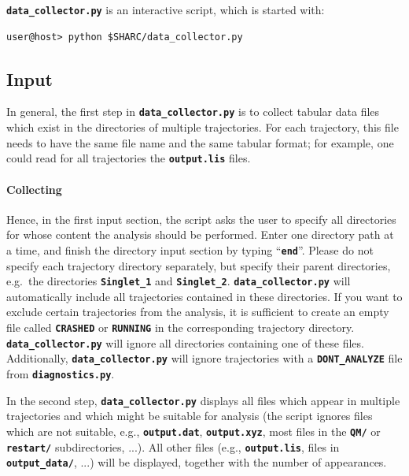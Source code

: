 \documentclass[a4paper,10pt,DIV=15,openany,twoside=false]{scrbook}
\newcommand{\ttt}[1]{\textbf{\texttt{#1}}}
\begin{document}
\ttt{data\_collector.py} is an interactive script, which is started with:
\begin{verbatim}
user@host> python $SHARC/data_collector.py
\end{verbatim}

\subsection{Input}

In general, the first step in \ttt{data\_collector.py} is to collect tabular data files which exist in the directories of multiple trajectories.
For each trajectory, this file needs to have the same file name and the same tabular format; for example, one could read for all trajectories the \ttt{output.lis} files.

\paragraph{Collecting}

Hence, in the first input section, the script asks the user to specify all directories for whose content the analysis should be performed. Enter one directory path at a time, and finish the directory input section by typing ``\ttt{end}''. Please do not specify each trajectory directory separately, but specify their parent directories, e.g.\ the directories \ttt{Singlet\_1} and \ttt{Singlet\_2}. \ttt{data\_collector.py} will automatically include all trajectories contained in these directories.
If you want to exclude certain trajectories from the analysis, it is sufficient to create an empty file called \ttt{CRASHED} or \ttt{RUNNING} in the corresponding trajectory directory. \ttt{data\_collector.py} will ignore all directories containing one of these files.
Additionally, \ttt{data\_collector.py} will ignore trajectories with a \ttt{DONT\_ANALYZE} file from \ttt{diagnostics.py}.

In the second step, \ttt{data\_collector.py} displays all files which appear in multiple trajectories and which might be suitable for analysis (the script ignores files which are not suitable, e.g., \ttt{output.dat}, \ttt{output.xyz}, most files in the \ttt{QM/} or \ttt{restart/} subdirectories, ...). 
All other files (e.g., \ttt{output.lis}, files in \ttt{output\_data/}, ...) will be displayed, together with the number of appearances.
\end{document}
